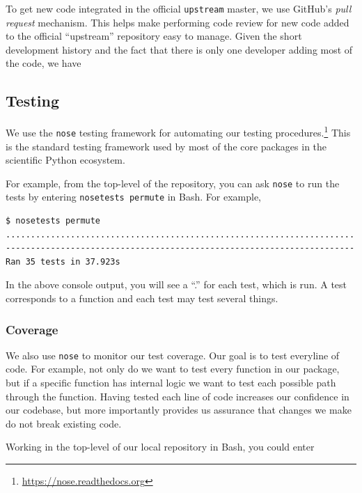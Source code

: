 To get new code integrated in the official \texttt{upstream} master, we use
GitHub's \emph{pull request} mechanism.  This helps make performing code review
for new code added to the official ``upstream'' repository easy to manage.
Given the short development history and the fact that there is only one
developer adding most of the code, we have 

\subsection{Testing}

We use the \texttt{nose} testing framework for automating our testing
procedures.\footnote{\url{https://nose.readthedocs.org}}  This is the
standard testing framework used by most of the core packages in
the scientific Python ecosystem.

For example, from the top-level of the repository, you can ask \texttt{nose}
to run the tests by entering \texttt{nosetests permute} in Bash.  For example,

\begin{verbatim}
$ nosetests permute 
......................................................................
----------------------------------------------------------------------
Ran 35 tests in 37.923s
\end{verbatim}

In the above console output, you will see a ``.'' for each test, which
is run.  A test corresponds to a function and each test may test several
things.

\subsubsection{Coverage}

We also use \texttt{nose} to monitor our test coverage.  Our goal is to
test everyline of code.  For example, not only do we want to test every
function in our package, but if a specific function has internal logic
we want to test each possible path through the function.  Having tested
each line of code increases our confidence in our codebase, but more
importantly provides us assurance that changes we make do not break
existing code.

Working in the top-level of our local repository in Bash, you could
enter


